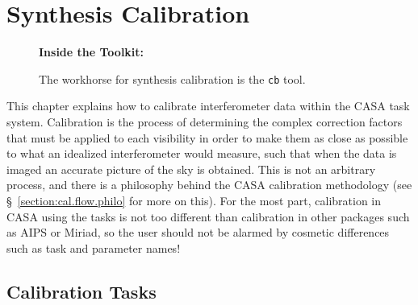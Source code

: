 

\chapter{Synthesis Calibration}
\label{chapter:cal}

\begin{wrapfigure}{r}{2.5in}
  \begin{boxedminipage}{2.5in}
     \centerline{\bf Inside the Toolkit:}
     The workhorse for synthesis calibration is the {\tt cb} tool.
  \end{boxedminipage}
\end{wrapfigure}

This chapter explains how to calibrate interferometer
data within the CASA task system.  Calibration is the process
of determining the complex correction factors that must be 
applied to each visibility in order to make them as close as
possible to what an idealized interferometer would measure, such
that when the data is imaged an accurate picture of the sky
is obtained.  This is not an arbitrary process, and there is
a philosophy behind the CASA calibration methodology (see
\S~\ref{section:cal.flow.philo} for more on this).  For the most part,
calibration in CASA using the tasks is not too different than
calibration in other packages such as AIPS or Miriad, so the user
should not be alarmed by cosmetic differences such as task and
parameter names!

\section{Calibration Tasks}
\label{section:cal.tasks}

